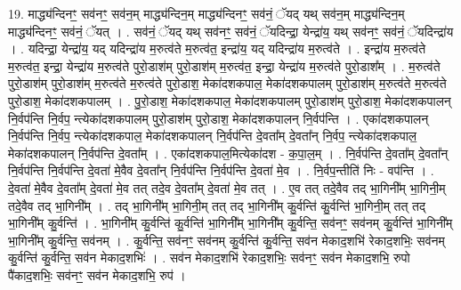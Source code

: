 \documentclass[17pt]{extarticle}
\begin{document}
19. माद्ध्य॑न्दिनꣳ॒॒ सव॑नꣳ॒॒ सव॑न॒म् माद्ध्य॑न्दिन॒म् माद्ध्य॑न्दिनꣳ॒॒ सव॑नं॒ ॅयद् यथ् सव॑न॒म् माद्ध्य॑न्दिन॒म् माद्ध्य॑न्दिनꣳ॒॒ सव॑नं॒ ॅयत् । . सव॑नं॒ ॅयद् यथ् सव॑नꣳ॒॒ सव॑नं॒ ॅयदिन्द्रा॒ येन्द्रा॑य॒ यथ् सव॑नꣳ॒॒ सव॑नं॒ ॅयदिन्द्रा॑य । . यदिन्द्रा॒ येन्द्रा॑य॒ यद् यदिन्द्रा॑य म॒रुत्व॑ते म॒रुत्व॑त॒ इन्द्रा॑य॒ यद् यदिन्द्रा॑य म॒रुत्व॑ते । . इन्द्रा॑य म॒रुत्व॑ते म॒रुत्व॑त॒ इन्द्रा॒ येन्द्रा॑य म॒रुत्व॑ते पुरो॒डाश॑म् पुरो॒डाश॑म् म॒रुत्व॑त॒ इन्द्रा॒
येन्द्रा॑य म॒रुत्व॑ते पुरो॒डाश᳚म् । . म॒रुत्व॑ते पुरो॒डाश॑म् पुरो॒डाश॑म् म॒रुत्व॑ते म॒रुत्व॑ते पुरो॒डाश॒ मेका॑दशकपाल॒ मेका॑दशकपालम् पुरो॒डाश॑म् म॒रुत्व॑ते म॒रुत्व॑ते पुरो॒डाश॒ मेका॑दशकपालम् । . पु॒रो॒डाश॒ मेका॑दशकपाल॒ मेका॑दशकपालम् पुरो॒डाश॑म् पुरो॒डाश॒ मेका॑दशकपालन् नि॒र्वप॑न्ति नि॒र्वप॒ न्त्येका॑दशकपालम् पुरो॒डाश॑म् पुरो॒डाश॒ मेका॑दशकपालन् नि॒र्वप॑न्ति । . एका॑दशकपालन् नि॒र्वप॑न्ति नि॒र्वप॒ न्त्येका॑दशकपाल॒ मेका॑दशकपालन् नि॒र्वप॑न्ति दे॒वता᳚म् दे॒वता᳚न् नि॒र्वप॒ न्त्येका॑दशकपाल॒ मेका॑दशकपालन् नि॒र्वप॑न्ति दे॒वता᳚म् । . एका॑दशकपाल॒मित्येका॑दश - क॒पा॒ल॒म् । . नि॒र्वप॑न्ति दे॒वता᳚म् दे॒वता᳚न् नि॒र्वप॑न्ति नि॒र्वप॑न्ति दे॒वता॑ मे॒वैव दे॒वता᳚न् नि॒र्वप॑न्ति नि॒र्वप॑न्ति दे॒वता॑ मे॒व । . नि॒र्वप॒न्तीति॑ निः - वप॑न्ति । . दे॒वता॑ मे॒वैव दे॒वता᳚म् दे॒वता॑ मे॒व तत् तदे॒व दे॒वता᳚म् दे॒वता॑ मे॒व तत् । . ए॒व तत् तदे॒वैव तद् भा॒गिनी᳚म् भा॒गिनी॒म् तदे॒वैव तद् भा॒गिनी᳚म् । . तद् भा॒गिनी᳚म् भा॒गिनी॒म् तत् तद् भा॒गिनी᳚म् कु॒र्वन्ति॑ कु॒र्वन्ति॑ भा॒गिनी॒म् तत् तद् भा॒गिनी᳚म् कु॒र्वन्ति॑ । . भा॒गिनी᳚म् कु॒र्वन्ति॑ कु॒र्वन्ति॑ भा॒गिनी᳚म् भा॒गिनी᳚म् कु॒र्वन्ति॒ सव॑नꣳ॒॒ सव॑नम् कु॒र्वन्ति॑ भा॒गिनी᳚म् भा॒गिनी᳚म् कु॒र्वन्ति॒ सव॑नम् । . कु॒र्वन्ति॒ सव॑नꣳ॒॒ सव॑नम् कु॒र्वन्ति॑ कु॒र्वन्ति॒ सव॑न मेकाद॒शभि॑ रेकाद॒शभिः॒ सव॑नम् कु॒र्वन्ति॑ कु॒र्वन्ति॒ सव॑न मेकाद॒शभिः॑ । . सव॑न मेकाद॒शभि॑ रेकाद॒शभिः॒ सव॑नꣳ॒॒ सव॑न मेकाद॒शभि॒ रुपो पै॑काद॒शभिः॒ सव॑नꣳ॒॒ सव॑न मेकाद॒शभि॒ रुप॑ । \newline
\end{document}
